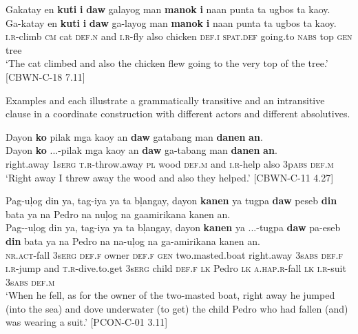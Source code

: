 \ea
\label{ex:topofthetree}
Gakatay en \textbf{kuti} \textbf{i} \textbf{daw} galayog man \textbf{manok} \textbf{i} naan punta ta ugbos ta kaoy. \\
\vspace{4pt} \gll Ga-katay en \textbf{kuti} \textbf{i} \textbf{daw} ga-layog man \textbf{manok} \textbf{i} naan punta ta ugbos ta kaoy. \\
\textsc{i.r}-climb \textsc{cm} cat \textsc{def.n} and \textsc{i.r}-fly also chicken \textsc{def.i} \textsc{spat.def} going.to \textsc{nabs} top \textsc{gen} tree \\
\glt ‘The cat climbed and also the chicken flew going to the very top of the tree.’ [CBWN-C-18 7.11]
\z

Examples  and  each illustrate a grammatically transitive and an intransitive clause in a coordinate construction with different actors and different absolutives. 

\ea
\label{ex:alsotheyhelped}
Dayon \textbf{ko} pilak mga kaoy an \textbf{daw} gatabang man \textbf{danen} \textbf{an}. \\
\vspace{4pt} \gll Dayon \textbf{ko} ...-pilak mga kaoy an \textbf{daw} ga-tabang man \textbf{danen} \textbf{an}. \\
right.away 1s\textsc{erg} \textsc{t.r}-throw.away \textsc{pl} wood \textsc{def.m} and \textsc{i.r}-help also 3p\textsc{abs} \textsc{def.m} \\
\glt `Right away I threw away the wood and also they helped.’ [CBWN-C-11 4.27]
\z

\ea
\label{ex:wearingasuit}
Pag-u\c{l}og din ya, tag-iya ya ta b\c{l}angay, dayon \textbf{kanen} ya tugpa \textbf{daw} peseb \textbf{din} bata ya na Pedro na nu\c{l}og na gaamirikana kanen an. \\
\gll Pag-{}-u\c{l}og din ya, tag-iya ya ta b\c{l}angay, dayon \textbf{kanen} ya ...-tugpa \textbf{daw} pa-eseb \textbf{din} bata ya na Pedro na na-u\c{l}og na ga-amirikana kanen an. \\
\textsc{nr.act}-fall 3s\textsc{erg} \textsc{def.f} owner \textsc{def.f}  \textsc{gen} two.masted.boat right.away 3s\textsc{abs} \textsc{def.f} \textsc{i.r}-jump and \textsc{t.r}-dive.to.get 3s\textsc{erg} child \textsc{def.f} \textsc{lk} Pedro \textsc{lk} \textsc{a.hap.r}-fall \textsc{lk} \textsc{i.r}-suit 3s\textsc{abs} \textsc{def.m} \\
\glt ‘When he fell, as for the owner of the two-masted boat, right away he jumped (into the sea) and dove underwater (to get) the child Pedro who had fallen (and) was wearing a suit.’ [PCON-C-01 3.11]
\z

